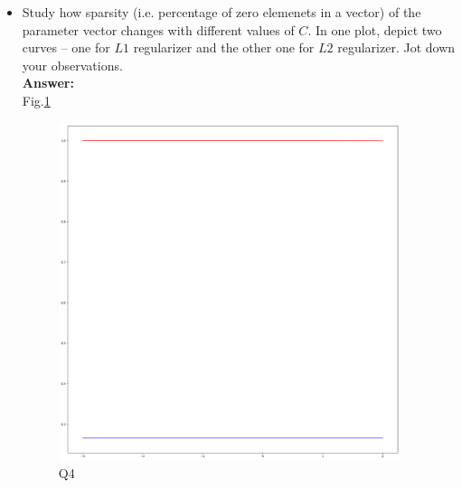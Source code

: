 \documentclass{article}
\begin{document}
\begin{itemize}
	\item Study how sparsity (i.e. percentage of zero elemenets in a vector) of the parameter vector changes with different values of $C$. In one plot, depict two curves -- one for $L1$ regularizer and the other one for $L2$ regularizer. Jot down your observations.
	\\\textbf{Answer:}\\
	Fig.\ref{fig:q4}
	
	\begin{figure}[!h]
		\centering
		\includegraphics[width=10cm]{./Python/result2.png}
		\caption{Q4}
		\label{fig:q4}
	\end{figure}
	
\end{itemize}
\end{document}
